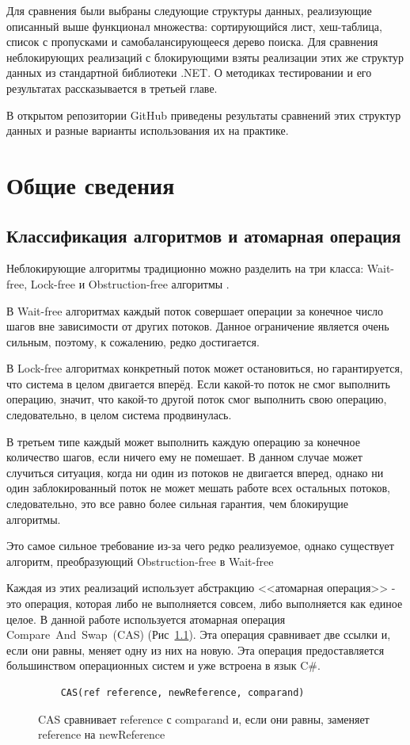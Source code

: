 \documentclass[12pt]{report}
\begin{document}
{		Для сравнения были выбраны следующие структуры данных, реализующие описанный выше функционал множества: сортирующийся лист, хеш-таблица, список с пропусками и самобалансирующееся дерево поиска. Для сравнения неблокирующих реализаций с блокирующими взяты реализации этих же структур данных из стандартной библиотеки .NET. О методиках тестировании и его результатах рассказывается в третьей главе.			
		
		В открытом репозитории GitHub \cite{My} приведены результаты сравнений этих структур данных и разные варианты использования их на практике.			
		
		\chapter{Общие сведения}
		
		\section{Классификация алгоритмов и атомарная операция}
		
		Неблокирующие алгоритмы традиционно можно разделить на три класса: Wait-free, Lock-free и Obstruction-free алгоритмы \cite{WaitFree}.
		
		В Wait-free алгоритмах каждый поток совершает операции за конечное число шагов вне зависимости от других потоков. Данное ограничение является очень сильным, поэтому, к сожалению, редко достигается.
		
		В Lock-free алгоритмах конкретный поток может остановиться, но гарантируется, что система в целом двигается вперёд. Если какой-то поток не смог выполнить операцию, значит, что какой-то другой поток смог выполнить свою операцию, следовательно, в целом система продвинулась.
		
		В третьем типе каждый может выполнить каждую операцию за конечное количество шагов, если ничего ему не помешает. В данном случае может случиться ситуация, когда ни один из потоков не двигается вперед, однако ни один заблокированный поток не может мешать работе всех остальных потоков, следовательно, это все равно более сильная гарантия, чем блокирущие алгоритмы.
		
		Это самое сильное требование из-за чего редко реализуемое, однако существует алгоритм, преобразующий Obstruction-free в Wait-free \cite{waitFree2}
		
		Каждая из этих реализаций использует абстракцию <<атомарная операция>> - это операция, которая либо не выполняется совсем, либо выполняется как единое целое. В данной работе используется атомарная операция Compare~And~Swap~(CAS) (Рис~\ref{pic:CAS}). Эта операция сравнивает две ссылки и, если они равны, меняет одну из них на новую. Эта операция предоставляется большинством операционных систем и уже встроена в язык C\#.
		\begin{figure}[h]
			\begin{lstlisting}
	CAS(ref reference, newReference, comparand)
			\end{lstlisting}
			\caption{CAS сравнивает reference с comparand и, если они равны, заменяет reference на newReference}
			\label{pic:CAS}
		\end{figure}
		
}
\end{document}
